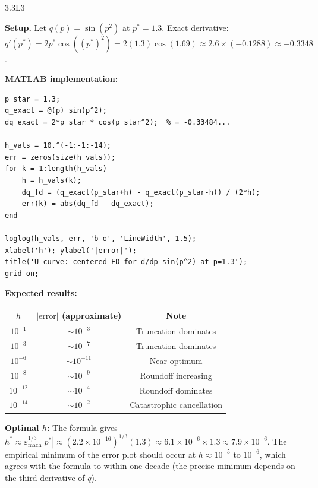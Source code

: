 \begin{solution}{3.3}{L3}

\solanswer

\textbf{Setup.} Let $q(p) = \sin(p^2)$ at $p^* = 1.3$.
Exact derivative: $q'(p^*) = 2p^*\cos((p^*)^2) = 2(1.3)\cos(1.69) \approx 2.6\times(-0.1288) \approx -0.3348$.

\textbf{MATLAB implementation:}
\begin{verbatim}
p_star = 1.3;
q_exact = @(p) sin(p^2);
dq_exact = 2*p_star * cos(p_star^2);  % = -0.33484...

h_vals = 10.^(-1:-1:-14);
err = zeros(size(h_vals));
for k = 1:length(h_vals)
    h = h_vals(k);
    dq_fd = (q_exact(p_star+h) - q_exact(p_star-h)) / (2*h);
    err(k) = abs(dq_fd - dq_exact);
end

loglog(h_vals, err, 'b-o', 'LineWidth', 1.5);
xlabel('h'); ylabel('|error|');
title('U-curve: centered FD for d/dp sin(p^2) at p=1.3');
grid on;
\end{verbatim}

\textbf{Expected results:}
\begin{center}
\begin{tabular}{ccc}
\toprule
$h$ & $|\text{error}|$ (approximate) & Note \\
\midrule
$10^{-1}$ & $\sim 10^{-3}$ & Truncation dominates \\
$10^{-3}$ & $\sim 10^{-7}$ & Truncation dominates \\
$10^{-6}$ & $\sim 10^{-11}$ & Near optimum \\
$10^{-8}$ & $\sim 10^{-9}$  & Roundoff increasing \\
$10^{-12}$ & $\sim 10^{-4}$ & Roundoff dominates \\
$10^{-14}$ & $\sim 10^{-2}$ & Catastrophic cancellation \\
\bottomrule
\end{tabular}
\end{center}

\textbf{Optimal $h$:} The formula gives $h^* \approx \varepsilon_{\text{mach}}^{1/3}|p^*|
\approx (2.2\times10^{-16})^{1/3}(1.3) \approx 6.1\times10^{-6}\times1.3
\approx 7.9\times10^{-6}$.
The empirical minimum of the error plot should occur at $h \approx 10^{-5}$
to $10^{-6}$, which agrees with the formula to within one decade
(the precise minimum depends on the third derivative of $q$).


\end{solution}

